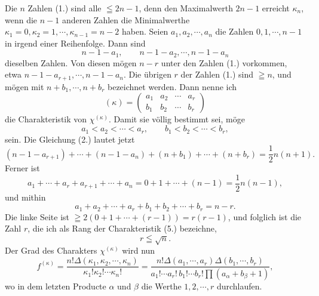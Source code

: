 \documentclass[11pt]{article}
\begin{document}
Die $n$ Zahlen (1.) sind alle $\leqq2n-1$, denn den Maximalwerth $2n-1$ erreicht $\kappa_n$, wenn die $n-1$ anderen Zahlen die Minimalwerthe $\kappa_1=0,
\kappa_2=1,
\cdots,
\kappa_{n-1}=n-2$ haben. Seien $a_1,
 a_2,
\cdots,
 a_n$ die Zahlen $0,1,
\cdots,n-1$ in irgend einer Reihenfolge. Dann sind
\[
 n-1-a_1,
\qquad n-1-a_2,
\cdots,
 n-1-a_n
\]
dieselben Zahlen. Von diesen mögen $n-r$ unter den Zahlen (1.) vorkommen, etwa $n-1-a_{r+1},
\cdots,n-1-a_n$. Die übrigen $r$ der Zahlen (1.) sind $\geqq n$, und mögen mit $n+b_1,
\cdots,n+b_r$ bezeichnet werden. Dann nenne ich
\begin{equation}\tag{5.}
 (\kappa)=\left(\begin{matrix}a_1&a_2&\cdots&a_r\\ b_1&b_2&\cdots&b_r\end{matrix}\right)
\end{equation}
die Charakteristik von $\chi^{(\kappa)}$. Damit sie völlig bestimmt sei, möge
\begin{equation}\tag{6.}
 a_1<a_2<\cdots<a_r,\qquad b_1<b_2<\cdots<b_r,
\end{equation}
sein. Die Gleichung (2.) lautet jetzt
\[
 (n-1-a_{r+1})+\cdots+(n-1-a_n)+(n+b_1)+\cdots+(n+b_r)=\frac12n(n+1).
\]
Ferner ist
\[
 a_1+\cdots+a_r+a_{r+1}+\cdots+a_n=0+1+\cdots+(n-1)=\frac12n(n-1),
\]
und mithin
\begin{equation}\tag{7.}
 a_1+a_2+\cdots+a_r+b_1+b_2+\cdots+b_r=n-r.
\end{equation}
Die linke Seite ist $\geqq2(0+1+\cdots+(r-1))=r(r-1)$, und folglich ist die Zahl $r$, die ich als Rang der Charakteristik (5.) bezeichne,
\begin{equation}\tag{8.}
 r\leqq\sqrt n.
\end{equation}
Der Grad des Charakters $\chi^{(\kappa)}$ wird nun
\begin{equation}\tag{9.}
 f^{(\kappa)}=\frac{n!\Delta(\kappa_1,
\kappa_2,
\cdots,
\kappa_n)}{\kappa_1!\kappa_2!\cdots\kappa_n!}
 =\frac{n!\Delta(a_1,
\cdots,a_r)\Delta(b_1,
\cdots,b_r)}{a_1!\cdots a_r!\,b_1!\cdots b_r!\prod(a_\alpha+b_\beta+1)},
\end{equation}
wo in dem letzten Producte $\alpha$ und $\beta$ die Werthe $1,2,\cdots,r$ durchlaufen.
\end{document}
